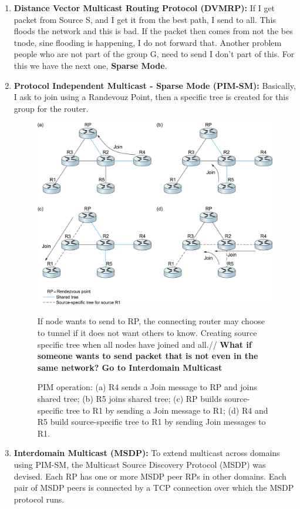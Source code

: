 \documentclass[12pt]{book}
\begin{document}
\begin{enumerate}
    \item \textbf{Distance Vector Multicast Routing Protocol (DVMRP):} If I get packet from Source S, and I get it from the best path, I send to all. This floods the network and this is bad. If the packet then comes from not the bes tnode, sine flooding is happening, I do not forward that.
    Another problem people who are not part of the group G, need to send I don't part of this. For this we have the next one, \textbf{Sparse Mode}.
    \item \textbf{Protocol Independent Multicast - Sparse Mode (PIM-SM):}  Basically, I ask to join using a Randevouz Point, then a specific tree is created for this group for the router.
    \begin{figure}[H]
        \centering
        \includegraphics[width = \textwidth]{Pictures/PIM-SM.png}
        \caption{PIM operation: (a) R4 sends a Join message to RP and joins shared tree; (b) R5 joins shared tree; (c) RP builds source-specific tree to R1 by sending a Join message to R1; (d) R4 and R5 build source-specific tree to R1 by sending Join messages to R1.}
        If node wants to send to RP, the connecting router may choose to tunnel if it does not want others to know. Creating source specific tree when all nodes have joined and all.//
        \textbf{What if someone wants to send packet that is not even in the same network? Go to Interdomain Multicast}
    \end{figure}
    \item \textbf{Interdomain Multicast (MSDP):} To extend multicast across domains using PIM-SM, the Multicast Source Discovery Protocol (MSDP) was devised. Each RP has one or more MSDP peer RPs in other domains. Each pair of MSDP peers is connected by a TCP connection over which the MSDP protocol runs.

\end{enumerate}
\end{document}
